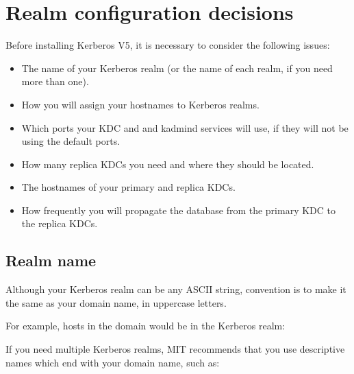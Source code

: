 \documentclass[letterpaper,10pt,english]{sphinxmanual}
\begin{document}
\sphinxstepscope


\chapter{Realm configuration decisions}
\label{\detokenize{admin/realm_config:realm-configuration-decisions}}\label{\detokenize{admin/realm_config::doc}}
\sphinxAtStartPar
Before installing Kerberos V5, it is necessary to consider the
following issues:
\begin{itemize}
\item {} 
\sphinxAtStartPar
The name of your Kerberos realm (or the name of each realm, if you
need more than one).

\item {} 
\sphinxAtStartPar
How you will assign your hostnames to Kerberos realms.

\item {} 
\sphinxAtStartPar
Which ports your KDC and and kadmind services will use, if they will
not be using the default ports.

\item {} 
\sphinxAtStartPar
How many replica KDCs you need and where they should be located.

\item {} 
\sphinxAtStartPar
The hostnames of your primary and replica KDCs.

\item {} 
\sphinxAtStartPar
How frequently you will propagate the database from the primary KDC
to the replica KDCs.

\end{itemize}


\section{Realm name}
\label{\detokenize{admin/realm_config:realm-name}}
\sphinxAtStartPar
Although your Kerberos realm can be any ASCII string, convention is to
make it the same as your domain name, in upper\sphinxhyphen{}case letters.

\sphinxAtStartPar
For example, hosts in the domain  would be in the
Kerberos realm:

\begin{sphinxVerbatim}[commandchars=\\\{\}]
\end{sphinxVerbatim}

\sphinxAtStartPar
If you need multiple Kerberos realms, MIT recommends that you use
descriptive names which end with your domain name, such as:
\end{document}

